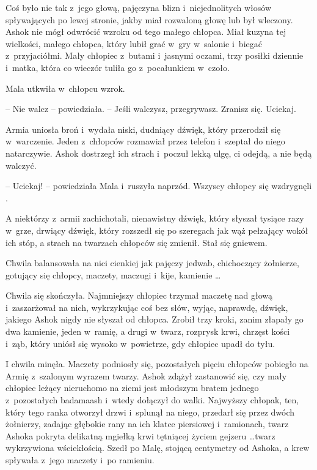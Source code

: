 \documentclass[oneside,polish,11pt,rmheadings]{mwbk}
\begin{document}
Coś było nie tak z~jego głową, pajęczyna blizn i~niejednolitych włosów spływających po lewej stronie, jakby miał rozwaloną głowę lub był wleczony. Ashok nie mógł odwrócić wzroku od tego małego chłopca. Miał kuzyna tej wielkości, małego chłopca, który lubił grać w~gry w~salonie i~biegać z~przyjaciółmi. Mały chłopiec z~butami i~jasnymi oczami, trzy posiłki dziennie i~matka, która co wieczór tuliła go z~pocałunkiem w~czoło.

Mala utkwiła w~chłopcu wzrok. 

-- Nie walcz -- powiedziała. -- Jeśli walczysz, przegrywasz. Zranisz się. Uciekaj. 

Armia uniosła broń i~wydała niski, dudniący dźwięk, który przerodził się w~warczenie. Jeden z~chłopców rozmawiał przez telefon i~szeptał do niego natarczywie. Ashok dostrzegł ich strach i~poczuł lekką ulgę, ci odejdą, a nie będą walczyć. 

-- Uciekaj! -- powiedziała Mala i~ruszyła naprzód. Wszyscy chłopcy się wzdrygnęli .

A niektórzy z~armii zachichotali, nienawistny dźwięk, który słyszał tysiące razy w~grze, drwiący dźwięk, który rozszedł się po szeregach jak wąż pełzający wokół ich stóp, a strach na twarzach chłopców się zmienił. Stał się gniewem.

Chwila balansowała na nici cienkiej jak pajęczy jedwab, chichoczący żołnierze, gotujący się chłopcy, maczety, maczugi i~kije, kamienie \ldots 

Chwila się skończyła. Najmniejszy chłopiec trzymał maczetę nad głową i~zaszarżował na nich, wykrzykując coś bez słów, wyjąc, naprawdę, dźwięk, jakiego Ashok nigdy nie słyszał od chłopca. Zrobił trzy kroki, zanim złapały go dwa kamienie, jeden w~ramię, a drugi w~twarz, rozprysk krwi, chrzęst kości i~ząb, który uniósł się wysoko w~powietrze, gdy chłopiec upadł do tyłu.

I chwila minęła. Maczety podniosły się, pozostałych pięciu chłopców pobiegło na Armię z~szalonym wyrazem twarzy. Ashok zdążył zastanowić się, czy mały chłopiec leżący nieruchomo na ziemi jest młodszym bratem jednego z~pozostałych badamaash i~wtedy dołączył do walki. Najwyższy chłopak, ten, który tego ranka otworzył drzwi i~splunął na niego, przedarł się przez dwóch żołnierzy, zadając głębokie rany na ich klatce piersiowej i~ramionach, twarz Ashoka pokryta delikatną mgiełką krwi tętniącej życiem gejzeru \ldots  twarz wykrzywiona wściekłością. Szedł po Malę, stojącą centymetry od Ashoka, a krew spływała z~jego maczety i~po ramieniu.
\end{document}
